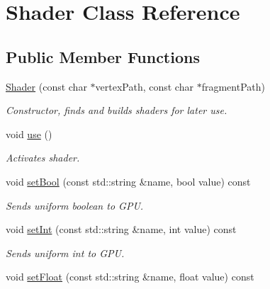 \hypertarget{class_shader}{\section{Shader Class Reference}
\label{class_shader}
}
\subsection*{Public Member Functions}
\begin{DoxyCompactItemize}
\item 
\hypertarget{class_shader_a3e135bbf914b087a939114d79c10d283}{\hyperlink{class_shader_a3e135bbf914b087a939114d79c10d283}{Shader} (const char $\ast$vertex\+Path, const char $\ast$fragment\+Path)}\label{class_shader_a3e135bbf914b087a939114d79c10d283}

\begin{DoxyCompactList}\small\item\em Constructor, finds and builds shaders for later use. \end{DoxyCompactList}\item 
\hypertarget{class_shader_a870fa9f13d69e558815d6fd351a469dc}{void \hyperlink{class_shader_a870fa9f13d69e558815d6fd351a469dc}{use} ()}\label{class_shader_a870fa9f13d69e558815d6fd351a469dc}

\begin{DoxyCompactList}\small\item\em Activates shader. \end{DoxyCompactList}\item 
\hypertarget{class_shader_a23700270a4fb0aaa2c2404c54e27cced}{void \hyperlink{class_shader_a23700270a4fb0aaa2c2404c54e27cced}{set\+Bool} (const std\+::string \&name, bool value) const }\label{class_shader_a23700270a4fb0aaa2c2404c54e27cced}

\begin{DoxyCompactList}\small\item\em Sends uniform boolean to G\+P\+U. \end{DoxyCompactList}\item 
\hypertarget{class_shader_a060af09412f03f9576f1d7e2cbe76a92}{void \hyperlink{class_shader_a060af09412f03f9576f1d7e2cbe76a92}{set\+Int} (const std\+::string \&name, int value) const }\label{class_shader_a060af09412f03f9576f1d7e2cbe76a92}

\begin{DoxyCompactList}\small\item\em Sends uniform int to G\+P\+U. \end{DoxyCompactList}\item 
\hypertarget{class_shader_a066880ecc3bdb350ec7491c892162dd0}{void \hyperlink{class_shader_a066880ecc3bdb350ec7491c892162dd0}{set\+Float} (const std\+::string \&name, float value) const }\label{class_shader_a066880ecc3bdb350ec7491c892162dd0}


\end{DoxyCompactItemize}
